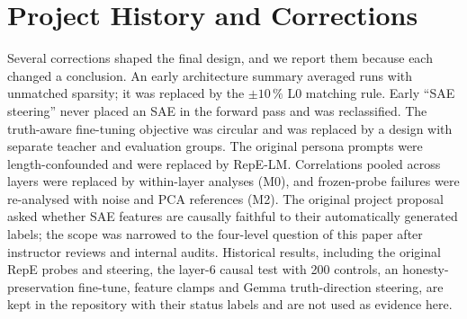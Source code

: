 

\section{Project History and Corrections}\label{app:history}

Several corrections shaped the final design, and we report them because each changed a conclusion. An early
architecture summary averaged runs with unmatched sparsity; it was replaced by the $\pm10\,\%$ L0 matching rule. Early
``SAE steering'' never placed an SAE in the forward pass and was reclassified. The truth-aware fine-tuning objective was
circular and was replaced by a design with separate teacher and evaluation groups. The original persona prompts were
length-confounded and were replaced by RepE-LM. Correlations pooled across layers were replaced by within-layer
analyses (M0), and frozen-probe failures were re-analysed with noise and PCA references (M2). The original project
proposal asked whether SAE features are causally faithful to their automatically generated labels; the scope was
narrowed to the four-level question of this paper after instructor reviews and internal audits. Historical results,
including the original RepE probes and steering, the layer-6 causal test with 200 controls, an honesty-preservation
fine-tune, feature clamps and Gemma truth-direction steering, are kept in the repository with their status labels and are
not used as evidence here.
